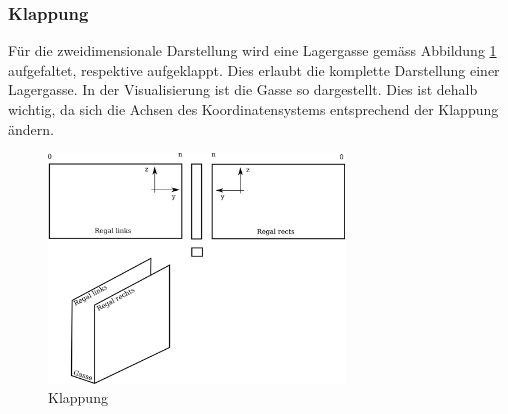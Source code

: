\subsubsection{Klappung}
Für die zweidimensionale Darstellung wird eine Lagergasse gemäss Abbildung \ref{fig:klapp} aufgefaltet, respektive aufgeklappt. Dies erlaubt die komplette Darstellung einer Lagergasse. In der Visualisierung ist die Gasse so dargestellt. Dies ist dehalb wichtig, da sich die Achsen des Koordinatensystems entsprechend der Klappung ändern.  
%
\begin{figure}[H]
  \begin{center}
    \includegraphics[width=0.7\textwidth]{images/klappung.png}
    \caption{Klappung}
    \label{fig:klapp}
  \end{center}
\end{figure}
%
